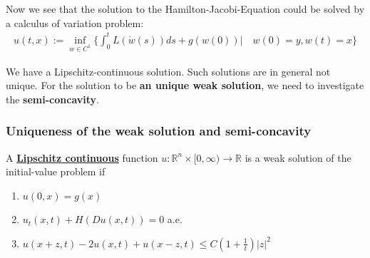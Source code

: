 Now we see that the solution to the Hamilton-Jacobi-Equation could be solved by a calculus of variation problem:
\begin{align*}
	u(t, x) := \inf_{w \in C^1} \bigg\{ \int_0^t L(\dot{w}(s) ) ds + g(w(0)) \bigg| \quad w(0) = y, w(t) = x\bigg\}
\end{align*}

We have a Lipschitz-continuous solution. Such solutions are in general not unique. For the solution to be \textbf{an unique weak solution}, we need to investigate the \textbf{semi-concavity}.

\subsubsection*{Uniqueness of the weak solution and semi-concavity}

\begin{definition}
	A \underline{\textbf{Lipschitz continuous}} function $u : \mathbb{R}^n \times [0, \infty) \rightarrow \mathbb{R}$ is a weak solution of the initial-value problem if
	\begin{enumerate}
		\item $u(0, x) = g(x)$ 
		\item $u_t(x, t) + H(Du(x, t)) = 0$ a.e.
		\item $u(x + z, t) - 2u(x, t) + u(x - z, t) \le C(1 + \frac{1}{t})|z|^2 $
	\end{enumerate}
\end{definition}

